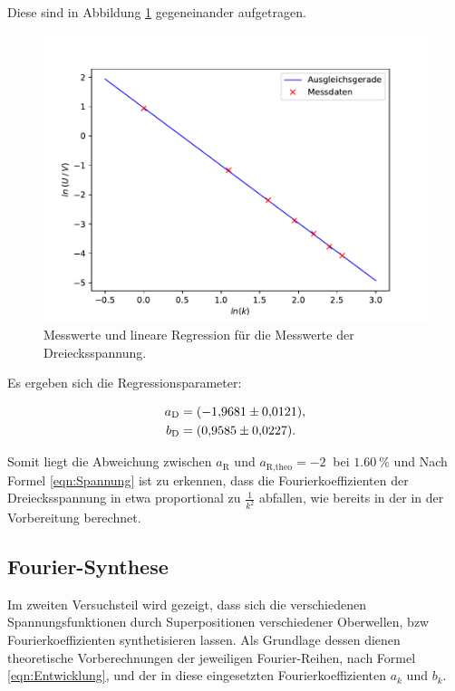 Diese sind in Abbildung \ref{fig:Drei} gegeneinander aufgetragen. 

\begin{figure}[H]
    \centering
    \includegraphics[scale=1.0]{content/plot3.pdf}
    \caption{Messwerte und lineare Regression für die Messwerte der Dreiecksspannung.}
    \label{fig:Drei}
\end{figure}

Es ergeben sich die Regressionsparameter:

\begin{align*}
    a_\text{D} &= \SI{-1.9681 \pm 0.0121}{}, \\
    b_\text{D} &= \SI{0.9585 \pm 0.0227}{}.
\end{align*}

Somit liegt die Abweichung zwischen $a_\text{R}$ und $a_\text{R,theo} = \SI{-2}{}$ bei $\SI{1.60}{\percent}$ und
Nach Formel \eqref{eqn:Spannung} ist zu erkennen, dass die Fourierkoeffizienten der Dreiecksspannung in etwa
proportional zu $\frac{1}{k^2}$ abfallen, wie bereits in der in der Vorbereitung berechnet.


\subsection{Fourier-Synthese}

Im zweiten Versuchsteil wird gezeigt, dass sich die verschiedenen Spannungsfunktionen
durch Superpositionen verschiedener Oberwellen, bzw Fourierkoeffizienten synthetisieren
lassen. Als Grundlage dessen dienen theoretische Vorberechnungen der jeweiligen
Fourier-Reihen, nach Formel \eqref{eqn:Entwicklung}, und der in diese eingesetzten
Fourierkoeffizienten $a_k$ und $b_k$.

